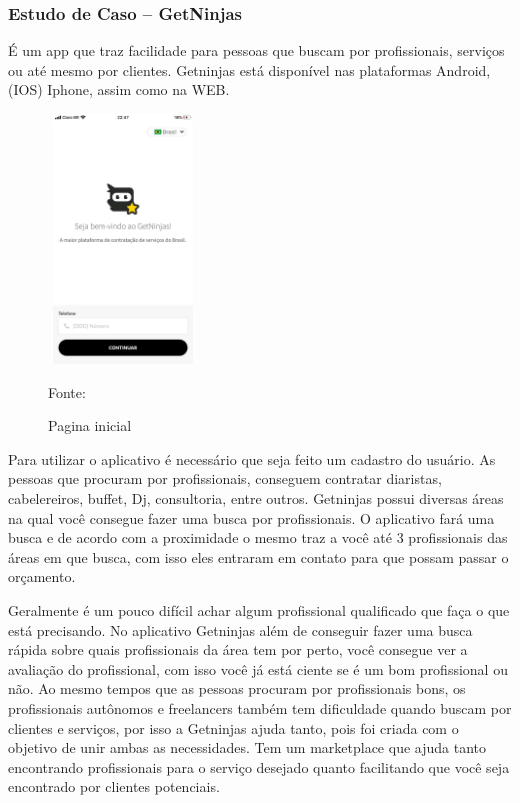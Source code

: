 \newpage
\subsubsection{Estudo de Caso – GetNinjas}

É um app que traz facilidade para pessoas que buscam por profissionais, serviços ou até mesmo por clientes. Getninjas está disponível nas plataformas Android, (IOS) Iphone, assim como na WEB.

\begin{figure}[!h]
	\centering
	\caption{Pagina inicial}
	\includegraphics[width=150px, height=250px]{./images/getNinjasMobile2.jpeg}
	\par {Fonte: \cite{get-ninjasMobilea}}
\end{figure}

Para utilizar o aplicativo é necessário que seja feito um cadastro do usuário. As pessoas que procuram por profissionais, conseguem contratar diaristas, cabelereiros, buffet, Dj, consultoria, entre outros. Getninjas possui diversas áreas na qual você consegue fazer uma busca por profissionais. O aplicativo fará uma busca e de acordo com a proximidade o mesmo traz a você até 3 profissionais das áreas em que busca, com isso eles entraram em contato para que possam passar o orçamento.

Geralmente é um pouco difícil achar algum profissional qualificado que faça o que está precisando. No aplicativo Getninjas além de conseguir fazer uma busca rápida sobre quais profissionais da área tem por perto, você consegue ver a avaliação do profissional, com isso você já está ciente se é um bom profissional ou não. Ao mesmo tempos que as pessoas procuram por profissionais bons, os profissionais autônomos e freelancers também tem dificuldade quando buscam por clientes e serviços, por isso a Getninjas ajuda tanto, pois foi criada com o objetivo de unir ambas as necessidades. Tem um marketplace que ajuda tanto encontrando profissionais para o serviço desejado quanto facilitando que você seja encontrado por clientes potenciais.

